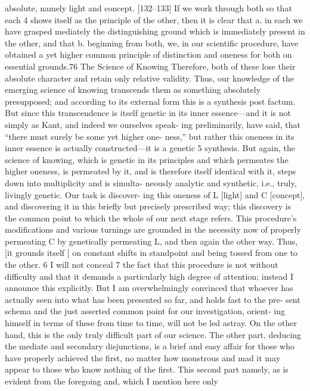 absolute, namely light and concept. [132–133] If we work through both so that
each 4 shows itself as the principle of the other, then it is clear that
a. in each we have grasped mediately the distinguishing ground which is
immediately present in the other, and that
b. beginning from both, we, in our scientific procedure, have obtained a yet
higher common principle of distinction and oneness for both on essential
grounds.76
The Science of Knowing
Therefore, both of these lose their absolute character and retain only relative
validity. Thus, our knowledge of the emerging science of knowing transcends
them as something absolutely presupposed; and according to its external form
this is a synthesis post factum. But since this transcendence is itself genetic in
its inner essence—and it is not simply as Kant, and indeed we ourselves speak-
ing preliminarily, have said, that “there must surely be some yet higher one-
ness,” but rather this oneness in its inner essence is actually constructed—it is
a genetic 5 synthesis. But again, the science of knowing, which is genetic in its
principles and which permeates the higher oneness, is permeated by it, and is
therefore itself identical with it, steps down into multiplicity and is simulta-
neously analytic and synthetic, i.e., truly, livingly genetic. Our task is discover-
ing this oneness of L [light] and C [concept], and discovering it in this briefly
but precisely prescribed way; this discovery is the common point to which the
whole of our next stage refers. This procedure’s modifications and various
turnings are grounded in the necessity now of properly permeating C by
genetically permeating L, and then again the other way. Thus, [it grounds
itself ] on constant shifts in standpoint and being tossed from one to the
other. 6 I will not conceal 7 the fact that this procedure is not without difficulty
and that it demands a particularly high degree of attention; instead I
announce this explicitly. But I am overwhelmingly convinced that whoever
has actually seen into what has been presented so far, and holds fast to the pre-
sent schema and the just asserted common point for our investigation, orient-
ing himself in terms of these from time to time, will not be led astray. On the
other hand, this is the only truly difficult part of our science. The other part,
deducing the mediate and secondary disjunctions, is a brief and easy affair for
those who have properly achieved the first, no matter how monstrous and mad
it may appear to those who know nothing of the first. This second part
namely, as is evident from the foregoing and, which I mention here only
